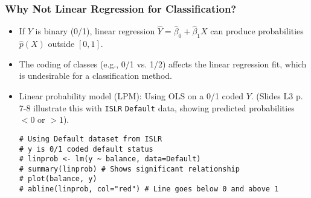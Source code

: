 \documentclass[12pt,a4paper]{article}
\newcommand{\Rpackage}[1]{\texttt{#1}} %
\newcommand{\Robject}[1]{\texttt{#1}} %
\begin{document}
\begin{itemize}
    \subsubsection{Why Not Linear Regression for Classification? }
        \begin{itemize}
            \item If $Y$ is binary (0/1), linear regression $\hat{Y} = \hat{\beta}_0 + \hat{\beta}_1 X$ can produce probabilities $\hat{p}(X)$ outside $[0,1]$.
            \item The coding of classes (e.g., 0/1 vs. 1/2) affects the linear regression fit, which is undesirable for a classification method.
            \item Linear probability model (LPM): Using OLS on a 0/1 coded $Y$. (Slides L3 p. 7-8 illustrate this with \Rpackage{ISLR} \Robject{Default} data, showing predicted probabilities $<0$ or $>1$).
\begin{lstlisting}[caption={Linear Probability Model Example (Slides L3 p.8)}]
# Using Default dataset from ISLR
# y is 0/1 coded default status
# linprob <- lm(y ~ balance, data=Default)
# summary(linprob) # Shows significant relationship
# plot(balance, y)
# abline(linprob, col="red") # Line goes below 0 and above 1
\end{lstlisting}
        \end{itemize}


\end{itemize}
\end{document}
